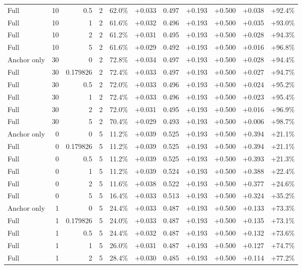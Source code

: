 \begin{table}[htbp]
\begin{tabular}{lrrrccccccc}
Full & 10 & 0.5 & 2 & 62.0\% & +0.033 & 0.497 & +0.193 & +0.500 & +0.038 & +92.4\% \\
Full & 10 & 1 & 2 & 61.6\% & +0.032 & 0.496 & +0.193 & +0.500 & +0.035 & +93.0\% \\
Full & 10 & 2 & 2 & 61.2\% & +0.031 & 0.495 & +0.193 & +0.500 & +0.028 & +94.3\% \\
Full & 10 & 5 & 2 & 61.6\% & +0.029 & 0.492 & +0.193 & +0.500 & +0.016 & +96.8\% \\
Anchor only & 30 & 0 & 2 & 72.8\% & +0.034 & 0.497 & +0.193 & +0.500 & +0.028 & +94.4\% \\
Full & 30 & 0.179826 & 2 & 72.4\% & +0.033 & 0.497 & +0.193 & +0.500 & +0.027 & +94.7\% \\
Full & 30 & 0.5 & 2 & 72.0\% & +0.033 & 0.496 & +0.193 & +0.500 & +0.024 & +95.2\% \\
Full & 30 & 1 & 2 & 72.4\% & +0.033 & 0.496 & +0.193 & +0.500 & +0.023 & +95.4\% \\
Full & 30 & 2 & 2 & 72.0\% & +0.031 & 0.495 & +0.193 & +0.500 & +0.016 & +96.9\% \\
Full & 30 & 5 & 2 & 70.4\% & +0.029 & 0.493 & +0.193 & +0.500 & +0.006 & +98.7\% \\
Anchor only & 0 & 0 & 5 & 11.2\% & +0.039 & 0.525 & +0.193 & +0.500 & +0.394 & +21.1\% \\
Full & 0 & 0.179826 & 5 & 11.2\% & +0.039 & 0.525 & +0.193 & +0.500 & +0.394 & +21.1\% \\
Full & 0 & 0.5 & 5 & 11.2\% & +0.039 & 0.525 & +0.193 & +0.500 & +0.393 & +21.3\% \\
Full & 0 & 1 & 5 & 11.2\% & +0.039 & 0.524 & +0.193 & +0.500 & +0.388 & +22.4\% \\
Full & 0 & 2 & 5 & 11.6\% & +0.038 & 0.522 & +0.193 & +0.500 & +0.377 & +24.6\% \\
Full & 0 & 5 & 5 & 16.4\% & +0.033 & 0.513 & +0.193 & +0.500 & +0.324 & +35.2\% \\
Anchor only & 1 & 0 & 5 & 24.4\% & +0.033 & 0.487 & +0.193 & +0.500 & +0.133 & +73.3\% \\
Full & 1 & 0.179826 & 5 & 24.0\% & +0.033 & 0.487 & +0.193 & +0.500 & +0.135 & +73.1\% \\
Full & 1 & 0.5 & 5 & 24.4\% & +0.032 & 0.487 & +0.193 & +0.500 & +0.132 & +73.6\% \\
Full & 1 & 1 & 5 & 26.0\% & +0.031 & 0.487 & +0.193 & +0.500 & +0.127 & +74.7\% \\
Full & 1 & 2 & 5 & 28.4\% & +0.030 & 0.485 & +0.193 & +0.500 & +0.114 & +77.2\% \\

\end{tabular}
\end{table}

